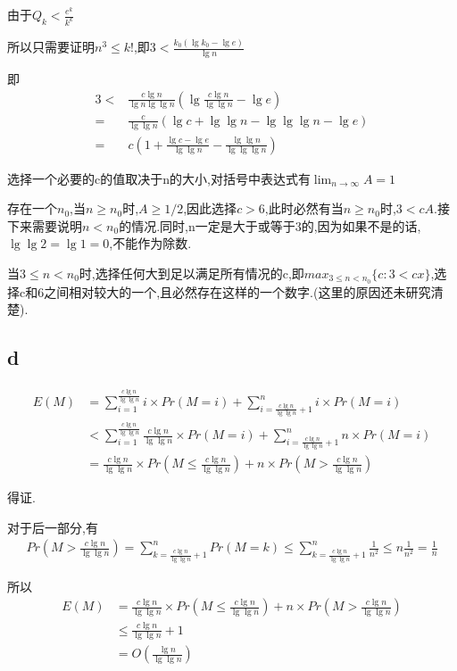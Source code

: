 \documentclass[12pt,a4paper,fontset=none]{ctexart}
\begin{document}
由于$Q_k<\frac{e^k}{k^k}$

所以只需要证明$n^3\leq k!$,即$3<\frac{k_0(\lg k_0-\lg e)}{\lg n} $

即
\begin{align*}
    3< & \frac{c\lg n}{\lg n\lg \lg n} (\lg \frac{c\lg n}{\lg \lg n}-\lg e )  \\
    =  & \frac{c}{\lg \lg n} (\lg c+\lg \lg n-\lg \lg \lg n-\lg e)            \\
    =  & c(1+\frac{\lg c-\lg e}{\lg \lg n} -\frac{\lg \lg n}{\lg \lg \lg n} )
\end{align*}

选择一个必要的c的值取决于n的大小,对括号中表达式有$\lim_{n \to \infty} A =1$

存在一个$n_0$,当$n\geq n_0$时,$A\geq 1/2$,因此选择$c>6$,此时必然有当$n\geq n_0$时,$3<cA$.接下来需要说明$n<n_0$的情况.同时,n一定是大于或等于3的,因为如果不是的话,$\lg \lg 2=\lg 1=0$,不能作为除数.

当$3\leq n<n_0$时,选择任何大到足以满足所有情况的c,即$max_{3\leq n<n_0}\{c:3<cx\}$,选择c和6之间相对较大的一个,且必然存在这样的一个数字.(这里的原因还未研究清楚).
\subsection{d}
\begin{align*}
    E(M) & =\sum_{i=1}^{\frac{c\lg n}{\lg \lg n} }i\times Pr(M=i)+\sum_{i=\frac{c\lg n}{\lg \lg n}+1}^{n}i\times Pr(M=i) \\ &< \sum_{i=1}^{\frac{c\lg n}{\lg \lg n} }\frac{c\lg n}{\lg \lg n}\times Pr(M=i)+\sum_{i=\frac{c\lg n}{\lg \lg n}+1}^{n}n\times Pr(M=i)\\ &=\frac{c\lg n}{\lg \lg n}\times Pr(M\leq \frac{c\lg n}{\lg \lg n})+n\times Pr(M>\frac{c\lg n}{\lg \lg n})
\end{align*}

得证.

对于后一部分,有
\begin{align*}
    Pr(M>\frac{c\lg n}{\lg \lg n})=\sum_{k=\frac{c\lg n}{\lg \lg n}+1}^{n}Pr(M=k)\leq \sum_{k=\frac{c\lg n}{\lg \lg n}+1}^{n}\frac{1}{n^2} \leq n\frac{1}{n^2} =\frac{1}{n}
\end{align*}

所以
\begin{align*}
    E(M) & =\frac{c\lg n}{\lg \lg n}\times Pr(M\leq \frac{c\lg n}{\lg \lg n})+n\times Pr(M>\frac{c\lg n}{\lg \lg n}) \\ &\leq \frac{c\lg n}{\lg \lg n}+1\\ &=O(\frac{\lg n}{\lg \lg n} )
\end{align*}
\end{document}
